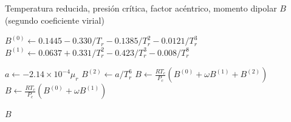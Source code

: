 


\begin{algorithm}[H]
\caption{Coeficiente Virial (Tsonopoulos)}
\label{alg:virial}
\begin{algorithmic}[1]
    \Require Temperatura reducida, presión crítica, factor acéntrico, momento dipolar
    \Ensure $B$ (segundo coeficiente virial)
    
    \State $B^{(0)} \gets 0.1445 - 0.330/T_r - 0.1385/T_r^2 - 0.0121/T_r^3$
    \State $B^{(1)} \gets 0.0637 + 0.331/T_r^2 - 0.423/T_r^3 - 0.008/T_r^8$
    
    \State
     
        \State $a \gets -2.14 \times 10^{-4} \mu_r$
        \State $B^{(2)} \gets a/T_r^6$
        \State $B \gets \frac{RT_c}{P_c}(B^{(0)} + \omega B^{(1)} + B^{(2)})$
    \Else
        \State $B \gets \frac{RT_c}{P_c}(B^{(0)} + \omega B^{(1)})$
    \EndIf
    
    \State \Return $B$
\EndFunction
\end{algorithmic}
\end{algorithm}

